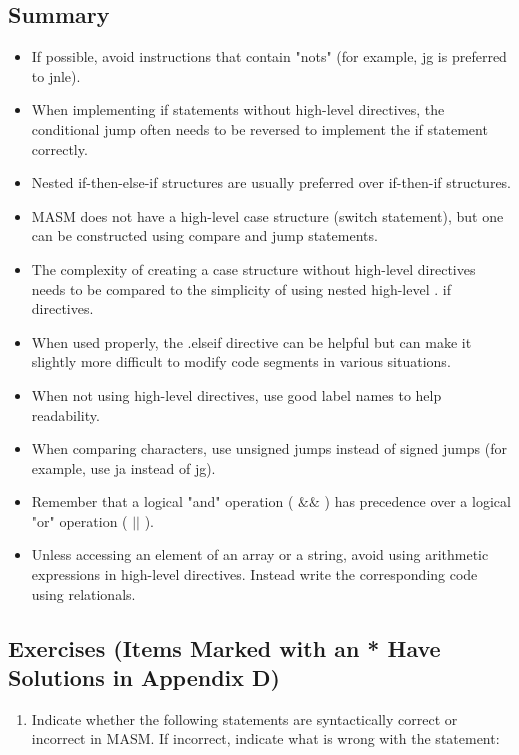 \documentclass[10pt]{article}
\begin{document}
\subsection*{Summary}
\begin{itemize}
  \item If possible, avoid instructions that contain "nots" (for example, jg is preferred to jnle).
  \item When implementing if statements without high-level directives, the conditional jump often needs to be reversed to implement the if statement correctly.
  \item Nested if-then-else-if structures are usually preferred over if-then-if structures.
  \item MASM does not have a high-level case structure (switch statement), but one can be constructed using compare and jump statements.
  \item The complexity of creating a case structure without high-level directives needs to be compared to the simplicity of using nested high-level . if directives.
  \item When used properly, the .elseif directive can be helpful but can make it slightly more difficult to modify code segments in various situations.
  \item When not using high-level directives, use good label names to help readability.
  \item When comparing characters, use unsigned jumps instead of signed jumps (for example, use ja instead of jg).
  \item Remember that a logical "and" operation ( $\& \&$ ) has precedence over a logical "or" operation ( $|\mid$ ).
  \item Unless accessing an element of an array or a string, avoid using arithmetic expressions in high-level directives. Instead write the corresponding code using relationals.
\end{itemize}

\subsection*{Exercises (Items Marked with an * Have Solutions in Appendix D)}
\begin{enumerate}
  \item Indicate whether the following statements are syntactically correct or incorrect in MASM. If incorrect, indicate what is wrong with the statement:
\end{enumerate}
\end{document}
